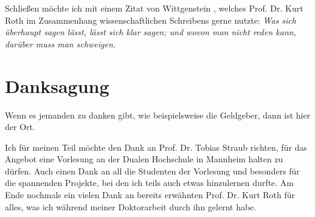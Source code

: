 \documentclass[10pt,twocolumn]{scrartcl}
\begin{document}
% 


Schließen möchte ich mit einem Zitat von Wittgenstein \cite{Wittgenstein1922},
welches Prof. Dr. Kurt Roth im Zusammenhang wissenschaftlichen
Schreibens gerne nutzte: {\it Was sich überhaupt sagen lässt, lässt
sich klar sagen; und wovon man nicht reden kann, darüber muss man
schweigen.} 

\section*{Danksagung}

Wenn es jemanden zu danken gibt, wie beispielsweise die Geldgeber, 
dann ist hier der Ort. 

Ich für meinen Teil möchte den Dank an Prof. Dr. Tobias Straub
richten, für das Angebot eine Vorlesung an der Dualen Hochschule in
Mannheim halten zu dürfen. Auch einen Dank an all die Studenten der Vorlesung
und besonders für die spannenden Projekte, bei den ich teils auch 
etwas hinzulernen durfte. Am Ende nochmals ein vielen Dank 
an bereits erwähnten Prof. Dr. Kurt Roth für alles, was ich während 
meiner Doktorarbeit durch ihn gelernt habe.
\end{document}

